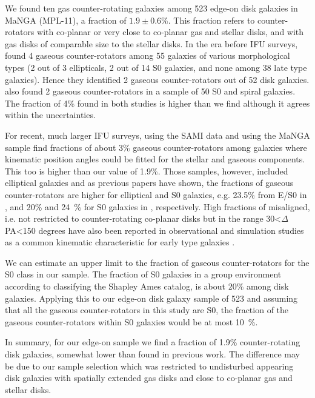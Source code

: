 \documentclass[fleqn,usenatbib]{mnras}
\begin{document}
We found ten gas counter-rotating galaxies among 523 edge-on disk galaxies 
in MaNGA (MPL-11), a fraction of $1.9 \pm 0.6\%$.
This fraction refers to counter-rotators with co-planar or very close to co-planar gas and stellar disks, and with gas disks of comparable size to the stellar disks. 
In the era before IFU surveys,
\citet{KannappanFabricant2001} found 4 gaseous counter-rotators among 55 galaxies of 
various morphological types (2 out of 3 ellipticals, 
2 out of 14 S0 galaxies, and none among 38 late type galaxies).
Hence they identified 2 gaseous counter-rotators out of 52 disk galaxies.
\citet{Pizzella2004} also found 2 gaseous counter-rotators 
in a sample of 50 S0 and spiral galaxies.
The fraction of 4\% found in both studies 
is higher than we find although it agrees within the uncertainties.


For recent, much larger IFU surveys, \citet{Bryant2019} using the SAMI data and \citet{Li2021} using the MaNGA sample find fractions of about 3\% gaseous counter-rotators among galaxies where kinematic position angles could be fitted 
for the stellar and gaseous components. This too 
is higher than our value of 1.9\%.
Those samples, however, included elliptical galaxies and as previous papers have shown, the fractions of gaseous counter-rotators are higher for elliptical and S0 galaxies,
e.g. 23.5\% from E/S0 in \citet{KannappanFabricant2001}, and 
20\% and 24~\% for S0 galaxies in \citet{Bertola1992,Kuijken1996}, respectively. High fractions of misaligned, i.e. not restricted to counter-rotating co-planar disks but in the range 30<$\Delta$ PA<150 degrees
have also been reported in observational and simulation studies
as a common kinematic characteristic for early type galaxies
\citep{Pizzella2004,Davis2011,Bryant2019,Duckworth2019,Duckworth2020,Khim2020,Xu2022}.


We can estimate an upper limit to the fraction of gaseous counter-rotators for the S0 class in our sample. 
The fraction of S0 galaxies in a group environment 
according to \citet{van_den_Bergh2009} 
classifying the Shapley Ames catalog, 
is about 20\% among disk galaxies.
Applying this to our edge-on disk galaxy sample of 523
and assuming that all the gaseous counter-rotators in this study are S0,
the fraction of the gaseous counter-rotators within S0 galaxies 
would be at most 10~\%.

In summary, for our edge-on sample we find a fraction of 1.9\% counter-rotating disk galaxies, somewhat lower than found in previous work. The difference may be due to our sample selection which was restricted to 
undisturbed appearing disk galaxies with spatially extended gas disks and close to co-planar gas and stellar disks.
\end{document}
